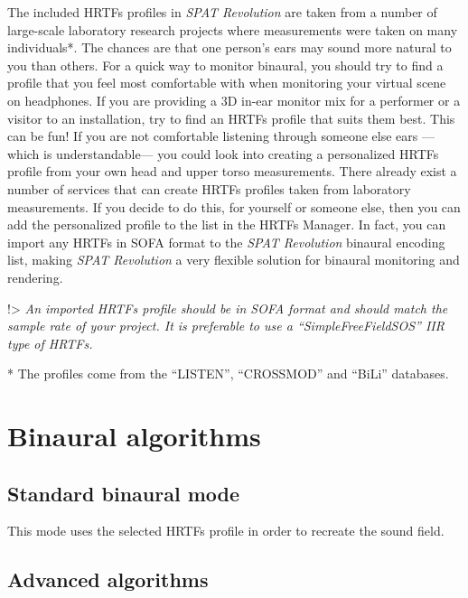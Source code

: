 \documentclass[
  letterpaper,
  DIV=11,
  numbers=noendperiod]{scrreport}
\begin{document}
The included HRTFs profiles in \emph{SPAT Revolution} are taken from a
number of large-scale laboratory research projects where measurements
were taken on many individuals*. The chances are that one person's ears
may sound more natural to you than others. For a quick way to monitor
binaural, you should try to find a profile that you feel most
comfortable with when monitoring your virtual scene on headphones. If
you are providing a 3D in-ear monitor mix for a performer or a visitor
to an installation, try to find an HRTFs profile that suits them best.
This can be fun! If you are not comfortable listening through someone
else ears ---which is understandable--- you could look into creating a
personalized HRTFs profile from your own head and upper torso
measurements. There already exist a number of services that can create
HRTFs profiles taken from laboratory measurements. If you decide to do
this, for yourself or someone else, then you can add the personalized
profile to the list in the HRTFs Manager. In fact, you can import any
HRTFs in SOFA format to the \emph{SPAT Revolution} binaural encoding
list, making \emph{SPAT Revolution} a very flexible solution for
binaural monitoring and rendering.

!\textgreater{} \emph{An imported HRTFs profile should be in SOFA format
and should match the sample rate of your project. It is preferable to
use a ``SimpleFreeFieldSOS'' IIR type of HRTFs.}

* The profiles come from the ``LISTEN'', ``CROSSMOD'' and ``BiLi''
databases.

\hypertarget{binaural-algorithms}{%
\section{Binaural algorithms}\label{binaural-algorithms}}

\hypertarget{standard-binaural-mode}{%
\subsection{Standard binaural mode}\label{standard-binaural-mode}}

This mode uses the selected HRTFs profile in order to recreate the sound
field.

\hypertarget{advanced-algorithms}{%
\subsection{Advanced algorithms}\label{advanced-algorithms}}
\end{document}

